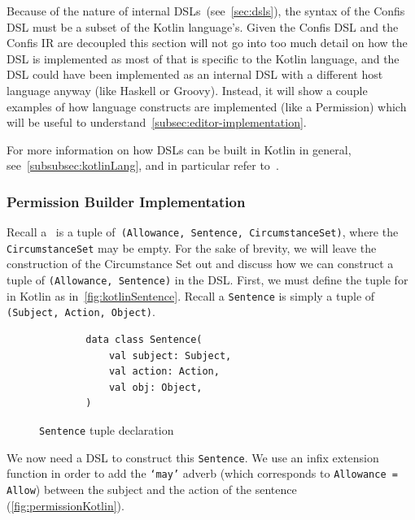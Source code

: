 Because of the nature of internal DSLs~(see~\autoref{sec:dsls}), the syntax of the Confis DSL must be a subset of the Kotlin language's.
Given the Confis DSL and the Confis IR are decoupled this section will not go into too much detail on how the DSL is implemented as most of that is specific to the Kotlin language, and the DSL could have been implemented as an internal DSL with a different host language anyway (like Haskell or Groovy).
Instead, it will show a couple examples of how language constructs are implemented (like a Permission) which will be useful to understand~\autoref{subsec:editor-implementation}.

For more information on how DSLs can be built in Kotlin in general, see~\autoref{subsubsec:kotlinLang}, and in particular refer to~\cite{kotlinTypeSafeBuilders}.

\subsubsection{Permission Builder Implementation}

Recall a~ is a tuple of~\texttt{(Allowance, Sentence, CircumstanceSet)}, where the \texttt{CircumstanceSet} may be empty.
For the sake of brevity, we will leave the construction of the Circumstance Set out and discuss how we can construct a tuple of \texttt{(Allowance, Sentence)} in the DSL.
First, we must define the tuple for~ in Kotlin as in~\autoref{fig:kotlinSentence}.
Recall a \texttt{Sentence} is simply a tuple of \texttt{(Subject, Action, Object)}.

\begin{figure}[h]
    \centering
    \begin{minipage}{0.4\textwidth}
        \begin{verbatim}
        data class Sentence(
            val subject: Subject,
            val action: Action,
            val obj: Object,
        )
        \end{verbatim}
    \end{minipage}
    \caption{\texttt{Sentence} tuple declaration}\label{fig:kotlinSentence}
\end{figure}

We now need a DSL to construct this \texttt{Sentence}.
We use an infix extension function in order to add the \texttt{`may'} adverb (which corresponds to \texttt{Allowance = Allow}) between the subject and the action of the sentence (\autoref{fig:permissionKotlin}).

